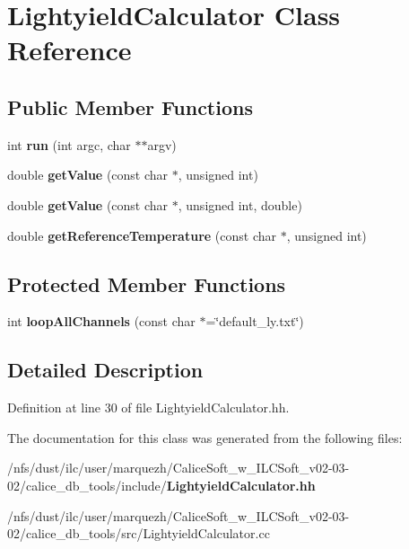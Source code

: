 \section{Lightyield\-Calculator Class Reference}
\label{classLightyieldCalculator}
\subsection*{Public Member Functions}
\begin{DoxyCompactItemize}
\item 
int {\bfseries run} (int argc, char $\ast$$\ast$argv)\label{classLightyieldCalculator_a96fcc722e4ecaa6e5306cd07ca20c914}

\item 
double {\bfseries get\-Value} (const char $\ast$, unsigned int)\label{classLightyieldCalculator_a3882a851b3ea64e88d731cdf53b8d4ff}

\item 
double {\bfseries get\-Value} (const char $\ast$, unsigned int, double)\label{classLightyieldCalculator_af936a6f685c4f12e871ab451ca233c1f}

\item 
double {\bfseries get\-Reference\-Temperature} (const char $\ast$, unsigned int)\label{classLightyieldCalculator_a46ae352a2979a5686aa4e3bcef9bc7f0}

\end{DoxyCompactItemize}
\subsection*{Protected Member Functions}
\begin{DoxyCompactItemize}
\item 
int {\bfseries loop\-All\-Channels} (const char $\ast$=\char`\"{}default\-\_\-ly.\-txt\char`\"{})\label{classLightyieldCalculator_a73a19c47cec74fa49f4af63d2398e5ed}

\end{DoxyCompactItemize}


\subsection{Detailed Description}


Definition at line 30 of file Lightyield\-Calculator.\-hh.



The documentation for this class was generated from the following files\-:\begin{DoxyCompactItemize}
\item 
/nfs/dust/ilc/user/marquezh/\-Calice\-Soft\-\_\-w\-\_\-\-I\-L\-C\-Soft\-\_\-v02-\/03-\/02/calice\-\_\-db\-\_\-tools/include/{\bf Lightyield\-Calculator.\-hh}\item 
/nfs/dust/ilc/user/marquezh/\-Calice\-Soft\-\_\-w\-\_\-\-I\-L\-C\-Soft\-\_\-v02-\/03-\/02/calice\-\_\-db\-\_\-tools/src/Lightyield\-Calculator.\-cc\end{DoxyCompactItemize}
